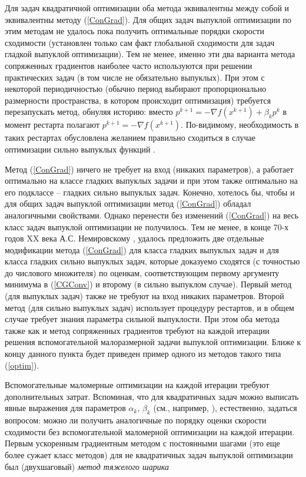   Для задач квадратичной оптимизации оба метода эквивалентны между собой и эквивалентны методу (\ref{ConGrad}). Для общих задач выпуклой оптимизации по этим методам не удалось пока получить оптимальные порядки скорости сходимости (установлен только сам факт глобальной сходимости для задач гладкой выпуклой оптимизации). Тем не менее, именно эти два варианта метода сопряженных градиентов наиболее часто используются при решении практических задач \cite{nocedal2006sequential} (в том числе не обязательно выпуклых). При этом с некоторой периодичностью (обычно период выбирают пропорционально размерности пространства, в котором происходит оптимизация) требуется перезапускать метод, обнуляя историю: вместо $p^{k+1}=-\nabla f\left( {x^{k+1}} \right)+\beta _k p^k$ в момент рестарта полагают $p^{k+1}=-\nabla f\left( {x^{k+1}} \right)$. По-видимому, необходимость в таких рестартах обусловлена желанием правильно сходиться в случае оптимизации сильно выпуклых функций \cite{o2015adaptive}.

  \iffalse
  Метод (\ref{ConGrad}) ничего не требует на вход (никаких параметров), а работает оптимально на классе гладких выпуклых задачи и при этом также оптимально на его подклассе -- гладких сильно выпуклых задач. Конечно, хотелось бы, чтобы и для общих задач выпуклой оптимизации метод (\ref{ConGrad}) обладал аналогичными свойствами. Однако перенести без изменений (\ref{ConGrad}) на весь класс задач выпуклой оптимизации не получилось. Тем не менее, в конце 70-х годов XX века А.С. Немировскому \cite{Nemirovski1979}, \cite{narkiss2005sequential}  удалось предложить две отдельные модификации метода (\ref{ConGrad}) для класса гладких выпуклых задач и для класса 
  гладких сильно выпуклых задач, которые доказуемо сходятся (с точностью до числового множителя) по оценкам, соответствующим первому аргументу минимума в (\ref{CGConv}) и второму (в сильно выпуклом случае). Первый метод (для выпуклых задач) также не требуют на вход никаких параметров. Второй метод (для сильно выпуклых задач) использует процедуру рестартов, и в общем случае требует знания параметра сильной выпуклости. При этом оба метода также как и метод сопряженных градиентов требуют на каждой итерации решения вспомогательной малоразмерной задачи выпуклой оптимизации. Ближе к концу данного пункта будет приведен пример одного из методов такого типа (\ref{optim}).

  Вспомогательные маломерные оптимизации на каждой итерации требуют дополнительных затрат. Вспоминая, что для квадратичных задач можно выписать явные выражения для параметров $\alpha_k$, $\beta_k$ (см., например, \cite{Polyak1983}), естественно, задаться вопросом: можно ли получить аналогичные по порядку оценки скорости сходимости без вспомогательной маломерной оптимизации на каждой итерации. Первым ускоренным градиентным методом с постоянными шагами (это еще более сужает класс методов) для не квадратичных задач выпуклой оптимизации был (двухшаговый) \textit{метод тяжелого шарика}


